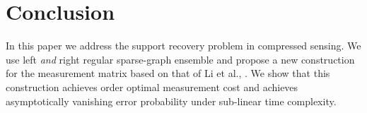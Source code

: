 \documentclass[conference]{IEEEtran}
\newcommand*{\MyPath}{../}
\begin{document}
\section{Conclusion}
In this paper we address the support recovery problem in compressed sensing. We use left \emph{and} right regular sparse-graph ensemble and propose a new construction for the measurement matrix based on that of Li et al., \cite{li2015subisit}. We show that this construction achieves order optimal measurement cost and achieves asymptotically vanishing error probability under sub-linear time complexity.
%
%
%


\end{document}
